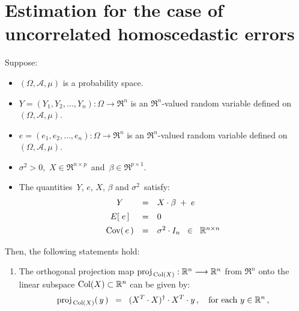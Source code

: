 

\section{Estimation for the case of uncorrelated homoscedastic errors}
\setcounter{theorem}{0}
\setcounter{equation}{0}

\renewcommand{\theenumi}{\roman{enumi}}
\renewcommand{\labelenumi}{\textnormal{(\theenumi)}$\;\;$}


\begin{theorem}
\mbox{}
\vskip 0.1cm
\noindent
Suppose:
\begin{itemize}
\item
	$(\Omega,\mathcal{A},\mu)$ is a probability space.
\item
	$Y = (Y_{1}, Y_{2}, \ldots, Y_{n}) : \Omega \longrightarrow \Re^{n}$ is an $\Re^{n}$-valued random variable
	defined on $(\Omega,\mathcal{A},\mu)$.
\item
	$e = (e_{1}, e_{2}, \ldots, e_{n}) : \Omega \longrightarrow \Re^{n}$ is an $\Re^{n}$-valued random variable
	defined on $(\Omega,\mathcal{A},\mu)$.
\item
	$\sigma^{2} > 0$,\, $X \in \Re^{n \times p}$\, and \,$\beta \in \Re^{p \times 1}$.
\item
	The quantities \,$Y$, $e$, $X$, $\beta$ and $\sigma^{2}$\, satisfy:
	\begin{equation*}
	\begin{array}{ccl}
	Y & = & X \cdot \beta \; + \; e
	\\
	E\!\left[\;e\,\right] &  \overset{{\color{white}\vert}}{=} & 0
	\\
	\Cov\!\left(\,e\,\right) & \overset{{\color{white}\vert}}{=} & \sigma^{2} \cdot I_{n} \;\; \in \;\; \Re^{n \times n}
	\end{array}
	\end{equation*}
\end{itemize}
Then, the following statements hold:
\begin{enumerate}
\item
	The orthogonal projection map $\textnormal{proj}_{\,\textnormal{Col}(X)} : \mathbb{R}^{n} \longrightarrow \mathbb{R}^{n}$
	from $\Re^{n}$ onto the linear subspace $\textnormal{Col}(X) \subset \mathbb{R}^{n}$ can be given by:
	\begin{equation*}
	\proj_{\,\Col(X)}(\,y\,) \;\; = \;\; (X^{T}\cdot X)^{\dagger} \cdot X^{T} \cdot y\,,
	\quad
	\textnormal{for each $y \in \Re^{n}$}\,,

\end{equation*}
\end{enumerate}
\end{theorem}
